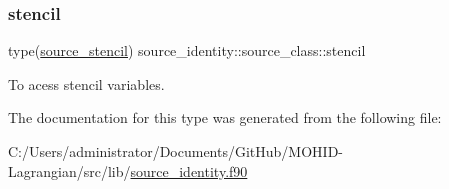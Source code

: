 \subsubsection{\texorpdfstring{stencil}{stencil}}
{\footnotesize\ttfamily type(\hyperlink{structsource__identity_1_1source__stencil}{source\+\_\+stencil}) source\+\_\+identity\+::source\+\_\+class\+::stencil\hspace{0.3cm}{\ttfamily [private]}}



To acess stencil variables. 



The documentation for this type was generated from the following file\+:\begin{DoxyCompactItemize}
\item 
C\+:/\+Users/administrator/\+Documents/\+Git\+Hub/\+M\+O\+H\+I\+D-\/\+Lagrangian/src/lib/\hyperlink{source__identity_8f90}{source\+\_\+identity.\+f90}\end{DoxyCompactItemize}
